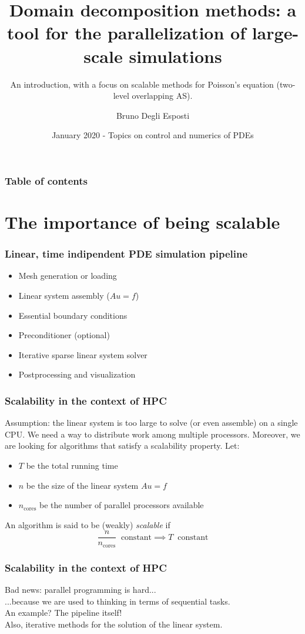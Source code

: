 \documentclass{beamer}
\title{Domain decomposition methods: a tool for the parallelization
	of large-scale simulations}
\subtitle{An introduction, with a focus on scalable methods for Poisson's equation
	(two-level overlapping AS).}
\author{Bruno Degli Esposti}
\date{January 2020 - Topics on control and numerics of PDEs}
\begin{document}
\begin{frame}
\maketitle
\end{frame}

\begin{frame}
\frametitle{Table of contents}
\tableofcontents
\end{frame}

\section{The importance of being scalable}
\begin{frame}
\frametitle{Linear, time indipendent PDE simulation pipeline}
\begin{itemize}%
\item Mesh generation or loading
\item Linear system assembly ($Au=f$)
\item Essential boundary conditions
\item Preconditioner (optional)
\item Iterative sparse linear system solver
\item Postprocessing and visualization
\end{itemize}
\end{frame}

\begin{frame}
\frametitle{Scalability in the context of HPC}
Assumption: the linear system is too large to solve (or even assemble)
on a single CPU. We need a way to distribute work among multiple processors.
Moreover, we are looking for algorithms that satisfy a scalability property.
Let:
\begin{itemize}%
\item $T$ be the total running time
\item $n$ be the size of the linear system $Au = f$
\item $n_\text{cores}$ be the number of parallel processors available
\end{itemize}
An algorithm is said to be (weakly) \emph{scalable} if
\[
\frac{n}{n_\text{cores}} \;\; \text{constant}
\implies T \;\; \text{constant}
\]
\end{frame}

\begin{frame}
\frametitle{Scalability in the context of HPC}
\begin{center}
Bad news: parallel programming is hard... \\[12pt]
\pause
...because we are used to thinking in terms of sequential tasks. \\[12pt]
\pause
An example? The pipeline itself! \\[12pt]
\pause
Also, iterative methods for the solution of the linear system.
\end{center}
\end{frame}
\end{document}
